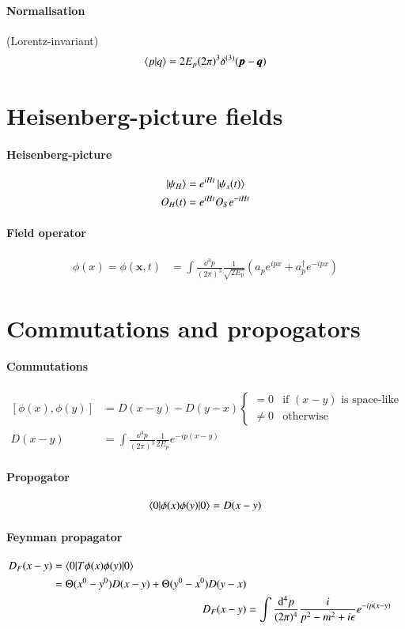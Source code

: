 \paragraph{Normalisation} (Lorentz-invariant)
\begin{align}
	\braket{p|q} = 2E_p (2\pi)^3 \delta^{(3)}(\pmb{p} - \pmb{q})
\end{align}
\section{Heisenberg-picture fields}
\paragraph{Heisenberg-picture}
\begin{align}
	\ket{\psi_H} &= e^{iHt}\ket{\psi_s (t)} \\
	O_H(t) & = e^{iHt}O_S e^{-iHt} 
\end{align}
\paragraph{Field operator}
\begin{align}
	\phi(x) = \phi({\pmb{x},t}) &= \int \frac{\dd^3 p}{(2\pi)^3}\frac{1}{\sqrt{2E_p}} \left( a_p e^{ipx} + a_{p}^\dagger e^{-i p x} \right)
\end{align}

\section{Commutations and propogators}
\paragraph{Commutations}
\begin{align}
	\left[ \phi(x), \phi(y) \right] &= D(x-y) - D(y-x)
	\begin{cases}
		= 0 & \text{if $(x-y)$ is space-like} \\
		\neq 0 & \text{otherwise}
	\end{cases} \\
	D(x-y) &= \int\frac{\dd^3p}{(2\pi)^3} \frac{1}{2E_p} e^{-ip(x-y)}
\end{align}
\paragraph{Propogator}
\begin{align}
	\braket{0 | \phi(x) \phi(y) | 0} = D(x-y)
\end{align}
\paragraph{Feynman propagator}
\begin{align}
	\begin{split}
	D_F(x-y) &= \braket{0 | T \phi(x) \phi(y) | 0} \\
			 &= \Theta(x^0 - y^0)D(x-y) + \Theta(y^0 - x^0) D(y-x)
	\end{split}\\
	D_F(x-y) &= \int \frac{\dd^4 p}{(2\pi)^4}\frac{i}{p^2-m^2+i\epsilon} e^{-ip(x-y)}
\end{align}

